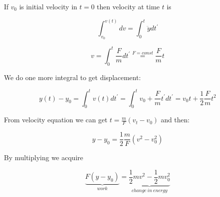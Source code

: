 If $v_0$ is initial velocity in $t=0$ then velocity at time $t$ is

$$\int_{v_0}^{v(t)} dv = \int_0^{t} \ddot{y} dt^\prime$$

$$v = \int_{0}^{t} \frac{F}{m} d t^\prime \stackrel{F=const}{=} \frac{F}{m}t$$

We do one more integral to get displacement:

$$y(t)-y_0 = \int_{0}^{t} v(t) dt^\prime = \int_{0}^{t} v_0 + \frac{F}{m}t^\prime dt^\prime = v_0t + \frac{1}{2}\frac{F}{m} t^2$$

From velocity equation we can get $t = \frac{m}{F}\left( v_t - v_0 \right)$ and then:

$$y-y_0 = \frac{1}{2}\frac{m}{F}\left( v^2 - v^2_0 \right)$$

By multiplying we acquire

$$\underbrace{F(y-y_0)}_{work} = \underbrace{\frac{1}{2}mv^2 - \frac{1}{2}mv_0^2}_{change \: in \: energy}$$
